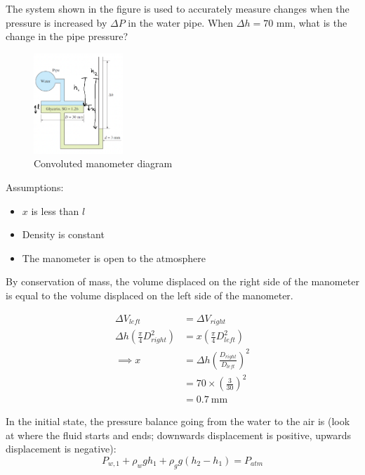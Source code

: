 \section{}
The system shown in the figure is used to accurately measure changes when the pressure 
is increased by $\Delta P$ in the water pipe. When $\Delta h = 70$ mm, what is the change 
in the pipe pressure?

\begin{figure}[h]
    \centering
    \includegraphics[width=0.3\textwidth]{Questions/Figures/Q3ProblemDiagram.png}
    \caption{Convoluted manometer diagram}
    \label{fig:Q3ProblemDiagram}
\end{figure}

Assumptions:
\begin{itemize}
    \item $x$ is less than $l$
    \item Density is constant
    \item The manometer is open to the atmosphere
\end{itemize}

By conservation of mass, the volume displaced on the right side of the manometer is equal to the volume displaced on the left side of the manometer. 

\begin{align}
    \Delta V_{left} &= \Delta V_{right} \nonumber \\
    \Delta h \left(\frac{\pi}{4} D_{right}^2\right) &= x \left(\frac{\pi}{4} D_{left}^2\right) \nonumber \\
    \implies x &= \Delta h \left(\frac{D_{right}}{D_{left}}\right)^2 \label{eq:Q3x} \nonumber \\
    &= 70 \times \left(\frac{3}{30}\right)^2 \nonumber \\
    &= \qty{0.7}{\milli\meter} \nonumber
\end{align}

In the initial state, the pressure balance going from the water to the air is (look at where the fluid starts and ends; 
downwards displacement is positive, upwards displacement is negative):
\begin{equation}
    P_{w, 1} + \rho_{w} g h_1 + \rho_{g} g (h_2 - h_1) = P_{atm} \label{eq:Q3State1}
\end{equation}

